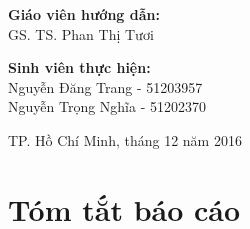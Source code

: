 \documentclass[12pt]{extarticle}
\begin{document}
\begin{titlepage}
\begin{flushright}
\begin{minipage}{0.7\textwidth}

\end{minipage}
\end{flushright}

\begin{flushleft} \large
\textbf{Giáo viên hướng dẫn:}\\
GS. TS. Phan Thị Tươi\\[2.0cm]
\end{flushleft}

\begin{flushleft} \large
\textbf{Sinh viên thực hiện:}\\
Nguyễn Đăng Trang - 51203957\\
Nguyễn Trọng Nghĩa - 51202370\\[2cm]
\end{flushleft}

\begin{flushleft} \large
\centering
TP. Hồ Chí Minh, tháng 12 năm 2016
\end{flushleft}

\vfill %

\end{titlepage}

\newpage
	\thispagestyle{empty}
	\tableofcontents

\newpage
	\listoffigures
	\listoftables

\newpage
	\section{Tóm tắt báo cáo}	
		
\end{document}
